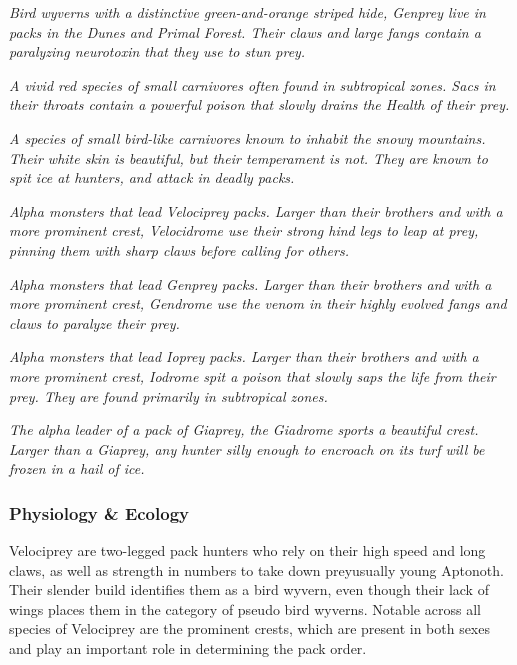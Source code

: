 \textit{Bird wyverns with a distinctive green-and-orange striped hide, Genprey live in packs in the Dunes and Primal Forest. Their claws and large fangs contain a paralyzing neurotoxin that they use to stun prey.}

\textit{A vivid red species of small carnivores often found in subtropical zones. Sacs in their throats contain a powerful poison that slowly drains the Health of their prey.}

\textit{A species of small bird-like carnivores known to inhabit the snowy mountains. Their white skin is beautiful, but their temperament is not. They are known to spit ice at hunters, and attack in deadly packs.}

\textit{Alpha monsters that lead Velociprey packs. Larger than their brothers and with a more prominent crest, Velocidrome use their strong hind legs to leap at prey, pinning them with sharp claws before calling for others.}

\textit{Alpha monsters that lead Genprey packs. Larger than their brothers and with a more prominent crest, Gendrome use the venom in their highly evolved fangs and claws to paralyze their prey.}

\textit{Alpha monsters that lead Ioprey packs. Larger than their brothers and with a more prominent crest, Iodrome spit a poison that slowly saps the life from their prey. They are found primarily in subtropical zones.}\par{}

\textit{The alpha leader of a pack of Giaprey, the Giadrome sports a beautiful crest. Larger than a Giaprey, any hunter silly enough to encroach on its turf will be frozen in a hail of ice.}

\subsubsection{Physiology \& Ecology}
Velociprey are two-legged pack hunters who rely on their high speed and long claws, as well as strength in numbers to take down prey\hbNone usually young Aptonoth. Their slender build identifies them as a bird wyvern, even though their lack of wings places them in the category of pseudo bird wyverns. Notable across all species of Velociprey are the prominent crests, which are present in both sexes and play an important role in determining the pack order.

